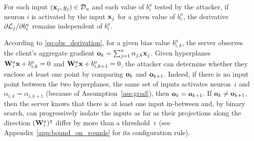 \begin{assumption}\label{ass:grad}
For each input $({\mathbf{x}}_j, y_j) \in \mathcal{D}_u$ and each value of $b^{a}_i$
tested by the attacker, if neuron $i$ is activated by the input ${\mathbf{x}}_j$ for a given value of $b^{a}_i$, the derivative ${\partial \mathcal{L}_j}/{\partial b^{a}_i}$ remains independent of $b^{a}_i$. %
\end{assumption}

According to \eqref{eq:obs_derivation}, for a given bias value $b^{a}_{i,k}$, the server observes the client's aggregate gradient ${\mathbf{o}}_k = \sum_{j=1}^n \alpha_{j,k} {\mathbf{x}}_j$. Given hyperplanes $\mathbf{W}^{a}_i {\mathbf{x}} + b^{a}_{i,k} = 0$ and $\mathbf{W}^{a}_i {\mathbf{x}} + b^{a}_{i,k+1} = 0$, the attacker can determine whether they enclose at least one point by comparing ${\mathbf{o}}_{k}$ and ${\mathbf{o}}_{k+1}$. Indeed, if there is no input point between the two hyperplanes, the same set of inputs activates neuron~$i$ and $\alpha_{i,k} = \alpha_{i,k+1}$ (because of Assumption~\ref{ass:grad}), then ${\mathbf{o}}_k={\mathbf{o}}_{k+1}$. If ${\mathbf{o}}_k\neq{\mathbf{o}}_{k+1}$, then the server knows that there is at least one input in-between and, by binary search, can progressively isolate the inputs as far as their projections along the direction $(\mathbf{W}_i^{a})^\intercal$ differ by more than a threshold~$\varepsilon$ (see Appendix~\ref{app:bound_on_rounds} for its configuration rule).

